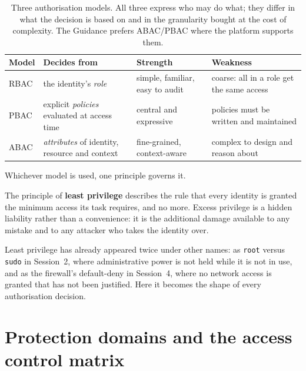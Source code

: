 \begin{table}[htbp]
\centering
\small
\begin{tabular}{@{}l p{3.5cm} p{3.0cm} p{3.3cm}@{}}
\toprule
\textbf{Model} & \textbf{Decides from} & \textbf{Strength} & \textbf{Weakness} \\
\midrule
RBAC & the identity's \emph{role} & simple, familiar, easy to audit & coarse: all in a role get the same access \\
PBAC & explicit \emph{policies} evaluated at access time & central and expressive & policies must be written and maintained \\
ABAC & \emph{attributes} of identity, resource and context & fine-grained, context-aware & complex to design and reason about \\
\bottomrule
\end{tabular}
\caption{Three authorisation models. All three express who may do what;
they differ in what the decision is based on and in the granularity bought at
the cost of complexity. The Guidance prefers ABAC/PBAC where the platform
supports them.}
\label{tab:authz}
\end{table}

Whichever model is used, one principle governs it.

\begin{definition}\label{def:leastpriv}
The principle of \textbf{least privilege} describes the rule that every
identity is granted the minimum access its task requires, and no more. Excess
privilege is a hidden liability rather than a convenience: it is the
additional damage available to any mistake and to any attacker who takes the
identity over.
\end{definition}

Least privilege has already appeared twice under other names: as
\texttt{root} versus \texttt{sudo} in Session~2, where administrative power
is not held while it is not in use, and as the firewall's default-deny in
Session~4, where no network access is granted that has not been justified.
Here it becomes the shape of every authorisation decision.

\section{Protection domains and the access control matrix}

